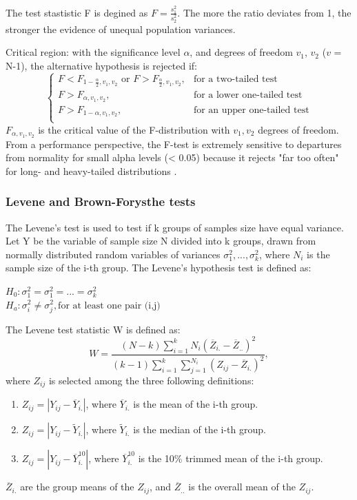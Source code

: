 The test stastistic F is degined as $F = \frac{s_1^2}{s_2^2 }$. The more the ratio deviates from 1, the stronger the evidence of unequal population variances.

Critical region: with the significance level $\alpha$, and degrees of freedom $v_1$, $v_2$ ($v$ = N-1), the alternative hypothesis is rejected if:
\begin{equation}
    \begin{cases}
        F < F_{1-\frac{\alpha}{2}, v_1, v_2} \text{ or } F > F_{\frac{\alpha}{2}, v_1, v_2}, & \text{for a two-tailed test}\\
        F > F_{\alpha, v_1, v_2}, & \text{for a lower one-tailed test}\\
        F > F_{1-\alpha, v_1, v_2}, & \text{for an upper one-tailed test}\\
    \end{cases}
\end{equation}
$F_{\alpha, v_1, v_2}$ is the critical value of the F-distribution with $v_1, v_2$ degrees of freedom. 
From a performance perspective, the F-test is extremely sensitive to departures from normality for small alpha levels (< 0.05) because it rejects "far too often" for long- and heavy-tailed distributions \cite{brown_1974}.

\subsubsection{Levene and Brown-Forysthe tests}
The Levene's test is used to test if k groups of samples size have equal variance.
Let Y be the variable of sample size N divided into k groups, drawn from normally distributed random variables of variances $\sigma_1^2, ..., \sigma_k^2$, where $N_i$ is the sample size of the i-th group. 
The Levene's hypothesis test is defined as:

\begin{center}
    $H_0: \sigma_1^2 = \sigma_1^2 = ... =  \sigma_k^2$ \\
    $H_a: \sigma_i^2 \neq \sigma_j^2, \text{for at least one pair (i,j)}$
\end{center}

The Levene test statistic W is defined as:
\begin{equation}
    W = \frac{ (N-k) \sum_{i=1}^k N_i (\overline{Z}_{i.} - \overline{Z}_{..})^2}{(k-1) \sum_{i=1}^k \sum_{j=1}^{N_i} (Z_{ij} - \overline{Z}_{i.} )^2},
\end{equation}
where $Z_{ij}$ is selected among the three following definitions:
\begin{enumerate}
    \item $Z_{ij} = |Y_{ij} - \overline{Y}_{i.} |$, where $\overline{Y}_{i.}$ is the mean of the i-th group.
    \item $Z_{ij} = |Y_{ij} - \widetilde{Y}_{i.} |$, where $\widetilde{Y}_{i.}$ is the median of the i-th group.
    \item $Z_{ij} = |Y_{ij} - \overline{Y}_{i.}^{10} |$, where $\overline{Y}_{i.}^{10}$ is the 10\% trimmed mean of the i-th group.
\end{enumerate}
$\overline{Z}_{i.}$ are the group means of the $Z_{ij}$, and $\overline{Z}_{..}$ is the overall mean of the $Z_{ij}$. 

